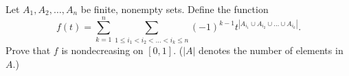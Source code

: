 Let $A_1,A_2,\dots, A_n$ be finite, nonempty sets. Define the function
\[f(t)=\sum_{k=1}^n \sum_{1\leq i_1<i_2<\dots<i_k\leq n} (-1)^{k-1}t^{|A_{i_1}\cup A_{i_2}\cup \dots\cup A_{i_k}|}.\]
Prove that $f$ is nondecreasing on $[0,1].$
($|A|$ denotes the number of elements in $A.$)